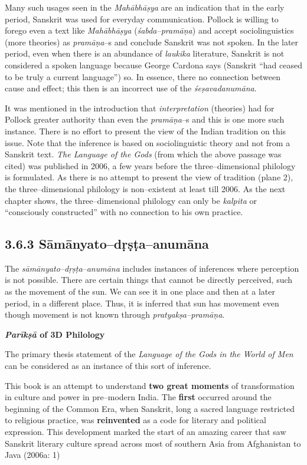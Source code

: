 Many such usages seen in the\textit{ Mahābhāṣya }are an indication that in the early period, Sanskrit was used for everyday communication. Pollock is willing to forego even a text like \textit{Mahābhāṣya }(\textit{śabda–pramāṇa}) and accept sociolinguistics (more theories) as \textit{pramāṇa}–s and conclude Sanskrit was not spoken. In the later period, even when there is an abundance of \textit{laukika} literature, Sanskrit is not considered a spoken language because George Cardona says (Sanskrit “had ceased to be truly a current language”) so. In essence, there no connection between cause and effect; this then is an incorrect use of the \textit{śeṣavadanumāna}.

It was mentioned in the introduction that \textit{interpretation} (theories) had for Pollock greater authority than even the\textit{ pramāṇa}–s and this is one more such instance. There is no effort to present the view of the Indian tradition on this issue. Note that the inference is based on sociolinguistic theory and not from a Sanskrit text. \textit{The Language of the Gods} (from which the above passage was cited) was published in 2006, a few years before the three–dimensional philology is formulated. As there is no attempt to present the view of tradition (plane 2), the three–dimensional philology is non–existent at least till 2006. As the next chapter shows, the three–dimensional philology can only be \textit{kalpita} or “consciously constructed” with no connection to his own practice.


\subsection*{3.6.3 Sāmānyato–dṛṣṭa–anumāna}

The \textit{sāmānyato–dṛṣṭa}–\textit{anumāna} includes instances of inferences where perception is not possible. There are certain things that cannot be directly perceived, such as the movement of the sun. We can see it in one place and then at a later period, in a different place. Thus, it is inferred that sun has movement even though movement is not known through\textit{ pratyakṣa–pramāṇa}.

\textbf{\textit{Parīkṣā} of 3D Philology}

The primary thesis statement of the \textit{Language of the Gods in the World of Men} can be considered as an instance of this sort of inference.

\begin{myquote}
This book is an attempt to understand \textbf{two great moments} of transformation in culture and power in pre–modern India. The \textbf{first} occurred around the beginning of the Common Era, when Sanskrit, long a sacred language restricted to religious practice, was \textbf{reinvented} as a code for literary and political expression. This development marked the start of an amazing career that saw Sanskrit literary culture spread across most of southern Asia from Afghanistan to Java (2006a: 1)
\end{myquote}


